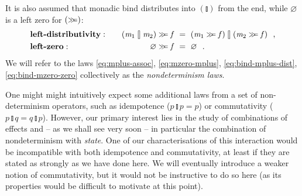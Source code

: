 \documentclass{jfp}
\newcommand{\Varid}[1]{\mathit{#1}}
\let\Varid\mathit
\begin{document}
It is also assumed that monadic bind distributes into \ensuremath{(\talloblong)} from the end,
while \ensuremath{\Varid{\varnothing}} is a left zero for \ensuremath{(\mathrel{\hstretch{0.7}{>\!\!>\!\!=}})}:
\begin{alignat}{2}
  &\mbox{\bf left-distributivity}:\quad &
  \ensuremath{(\Varid{m}_{1}\mathbin{\talloblong}\Varid{m}_{2})\mathrel{\hstretch{0.7}{>\!\!>\!\!=}}\Varid{f}} ~&=~ \ensuremath{(\Varid{m}_{1}\mathrel{\hstretch{0.7}{>\!\!>\!\!=}}\Varid{f})\mathbin{\talloblong}(\Varid{m}_{2}\mathrel{\hstretch{0.7}{>\!\!>\!\!=}}\Varid{f})} \mbox{~~,}
  \label{eq:bind-mplus-dist}\\
  &\mbox{\bf left-zero}:\quad &
  \ensuremath{\Varid{\varnothing}\mathrel{\hstretch{0.7}{>\!\!>\!\!=}}\Varid{f}} ~&=~ \ensuremath{\Varid{\varnothing}} \label{eq:bind-mzero-zero} \mbox{~~.}
\end{alignat}
We will refer to the laws \eqref{eq:mplus-assoc}, \eqref{eq:mzero-mplus},
\eqref{eq:bind-mplus-dist}, \eqref{eq:bind-mzero-zero} collectively as the
\emph{nondeterminism laws}.

One might might intuitively expect some additional laws from a set of non-determinism
operators, such as idempotence (\ensuremath{\Varid{p}\mathbin{\talloblong}\Varid{p}\mathrel{=}\Varid{p}}) or
commutativity (\ensuremath{\Varid{p}\mathbin{\talloblong}\Varid{q}\mathrel{=}\Varid{q}\mathbin{\talloblong}\Varid{p}}).
However, our primary interest lies in the study of combinations of effects and
-- as we shall see very soon -- in particular the combination of nondeterminism with
\emph{state}.
One of our characterisations of this interaction would be incompatible with both
idempotence and commutativity, at least if they are stated as strongly as we
have done here. We will eventually introduce a weaker notion of commutativity,
but it would not be instructive to do so here (as its properties would be
difficult to motivate at this point).
\end{document}
